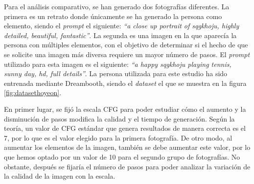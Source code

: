 Para el análisis comparativo, se han generado dos fotografías diferentes. La primera es un retrato donde únicamente se ha generado la persona como elemento, siendo el \textit{prompt} el siguiente: \textit{``a close up portrait of sqgkhoju, highly detailed, beautiful, fantastic''}. La segunda es una imagen en la que aparecía la persona con múltiples elementos, con el objetivo de determinar si el hecho de que se solicite una imagen más diversa requiere un mayor número de pasos. El \textit{prompt} utilizado para esta imagen es el siguiente: \textit{``a happy sqgkhoju playing tennis, sunny day, hd, full details''}. La persona utilizada para este estudio ha sido entrenada mediante Dreambooth, siendo el \textit{dataset} el que se  muestra en la figura \ref{fig:datasethoyeon}.

En primer lugar, se fijó la escala CFG para poder estudiar cómo el aumento y la disminución de pasos modifica la calidad y el tiempo de generación. Según la teoría, un valor de CFG estándar que genera resultados de manera correcta es el 7, por lo que es el valor elegido para la primera fotografía. De otro modo, al aumentar los elementos de la imagen, también se debe aumentar este valor, por lo que hemos optado por un valor de 10 para el segundo grupo de fotografías. No obstante, después se fijaría el número de pasos para poder analizar la variación de la calidad de la imagen con la escala.



